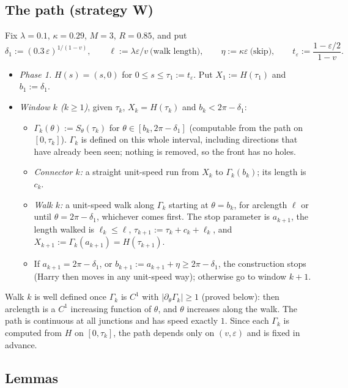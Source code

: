 \subsection{The path (strategy W)}\label{sec:D3-W}
Fix $\lambda=0.1$, $\kappa=0.29$, $M=3$, $R=0.85$, and put
\[
\delta_1:=(0.3\,\varepsilon)^{1/(1-v)},\qquad \ell:=\lambda\varepsilon/v\ \text{(walk length)},\qquad
\eta:=\kappa\varepsilon\ \text{(skip)},\qquad t_\varepsilon:=\frac{1-\varepsilon/2}{1-v}.
\]
\begin{itemize}
\item \emph{Phase 1.} $H(s)=(s,0)$ for $0\le s\le\tau_1:=t_\varepsilon$. Put $X_1:=H(\tau_1)$ and $b_1:=\delta_1$.
\item \emph{Window $k$ ($k\ge1$)}, given $\tau_k$, $X_k=H(\tau_k)$ and $b_k<2\pi-\delta_1$:
\begin{itemize}
\item $\Gamma_k(\theta):=S_\theta(\tau_k)$ for $\theta\in[b_k,2\pi-\delta_1]$ (computable from the path on $[0,\tau_k]$).
$\Gamma_k$ is defined on this whole interval, including directions that have already been seen; nothing is removed, so the
front has no holes.
\item \emph{Connector $k$:} a straight unit-speed run from $X_k$ to $\Gamma_k(b_k)$; its length is $c_k$.
\item \emph{Walk $k$:} a unit-speed walk along $\Gamma_k$ starting at $\theta=b_k$, for arclength $\ell$ or until $\theta=2\pi-\delta_1$,
whichever comes first. The stop parameter is $a_{k+1}$, the length walked is $\ell_k\le\ell$, $\tau_{k+1}:=\tau_k+c_k+\ell_k$, and
$X_{k+1}:=\Gamma_k(a_{k+1})=H(\tau_{k+1})$.
\item If $a_{k+1}=2\pi-\delta_1$, or $b_{k+1}:=a_{k+1}+\eta\ge2\pi-\delta_1$, the construction stops (Harry then moves in any
unit-speed way); otherwise go to window $k+1$.
\end{itemize}
\end{itemize}
Walk $k$ is well defined once $\Gamma_k$ is $C^1$ with $|\partial_\theta\Gamma_k|\ge1$ (proved below): then arclength is a $C^1$
increasing function of $\theta$, and $\theta$ increases along the walk. The path is continuous at all junctions and has speed
exactly $1$. Since each $\Gamma_k$ is computed from $H$ on $[0,\tau_k]$, the path depends only on $(v,\varepsilon)$ and is fixed in
advance.

\subsection{Lemmas}

